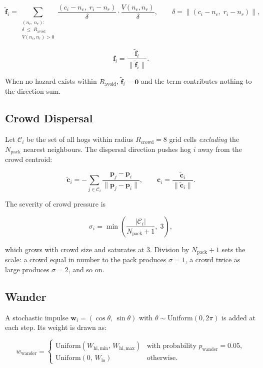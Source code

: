 \documentclass[11pt]{article}
\begin{document}
\[
  \tilde{\mathbf{f}}_i
    = \sum_{\substack{(n_c,\, n_r):\\ \delta \;\leq\; R_{\mathrm{avoid}} \\[2pt] V(n_c,n_r) > 0}}
      \frac{(c_i - n_c,\; r_i - n_r)}{\delta}
      \cdot \frac{V(n_c, n_r)}{\delta},
  \qquad
  \delta = \bigl\|(c_i - n_c,\; r_i - n_r)\bigr\|,
\]

\[
  \mathbf{f}_i = \frac{\tilde{\mathbf{f}}_i}{\|\tilde{\mathbf{f}}_i\|}.
\]

When no hazard exists within $R_{\mathrm{avoid}}$, $\tilde{\mathbf{f}}_i = \mathbf{0}$
and the term contributes nothing to the direction sum.

\subsection{Crowd Dispersal}

Let $\mathcal{C}_i$ be the set of all hogs within radius $R_{\mathrm{crowd}} = 8$
grid cells \emph{excluding} the $N_{\mathrm{pack}}$ nearest neighbours.  The
dispersal direction pushes hog $i$ away from the crowd centroid:

\[
  \tilde{\mathbf{c}}_i
    = -\sum_{j \in \mathcal{C}_i}
        \frac{\mathbf{p}_j - \mathbf{p}_i}{\|\mathbf{p}_j - \mathbf{p}_i\|},
  \qquad
  \mathbf{c}_i = \frac{\tilde{\mathbf{c}}_i}{\|\tilde{\mathbf{c}}_i\|}.
\]

The severity of crowd pressure is

\[
  \sigma_i = \min\!\left(\frac{|\mathcal{C}_i|}{N_{\mathrm{pack}} + 1},\; 3\right),
\]

which grows with crowd size and saturates at 3.  Division by
$N_{\mathrm{pack}} + 1$ sets the scale: a crowd equal in number to the pack
produces $\sigma = 1$, a crowd twice as large produces $\sigma = 2$, and so on.

\subsection{Wander}

A stochastic impulse $\mathbf{w}_i = (\cos\theta,\,\sin\theta)$ with
$\theta \sim \mathrm{Uniform}(0, 2\pi)$ is added at each step.  Its weight
is drawn as:

\[
  w_{\mathrm{wander}} =
  \begin{cases}
    \mathrm{Uniform}(W_{\mathrm{hi,min}},\, W_{\mathrm{hi,max}})
      & \text{with probability } p_{\mathrm{wander}} = 0.05,\\[4pt]
    \mathrm{Uniform}(0,\, W_{\mathrm{lo}})
      & \text{otherwise.}
  \end{cases}
\]
\end{document}
